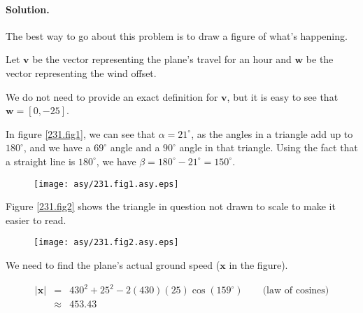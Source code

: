 
\paragraph{Solution.}


The best way to go about this problem is to draw a figure of what's happening.

Let $\mathbf{v}$ be the vector representing the plane's travel for an hour and $\mathbf{w}$ be the vector representing the wind offset.

We do not need to provide an exact definition for $\mathbf{v}$, but it is easy to see that $\mathbf{w}=\left[0,-25\right]$.

In figure \vref{231.fig1}, we can see that $\alpha=21^\circ$, as the angles in a triangle add up to $180^\circ$, and we have a $69^\circ$ angle and a $90^\circ$ angle in that triangle. Using the fact that a straight line is $180^\circ$, we have $\beta=180^\circ-21^\circ=150^\circ$.

\begin{figure}[h]\caption{}\label{231.fig1}\begin{center}\texttt{[image: asy/231.fig1.asy.eps]}\end{center}\end{figure}

Figure \vref{231.fig2} shows the triangle in question not drawn to scale to make it easier to read.

\begin{figure}[h]\caption{}\label{231.fig2}\begin{center}\texttt{[image: asy/231.fig2.asy.eps]}\end{center}\end{figure}

We need to find the plane's actual ground speed ($\mathbf{x}$ in the figure).

\begin{eqnarray*}
	\left|\mathbf{x}\right|&=&430^2+25^2-2\left(430\right)\left(25\right)\cos\left(159^\circ\right)\qquad\mbox{(law of cosines)}\\
	&\approx&453.43
\end{eqnarray*}

